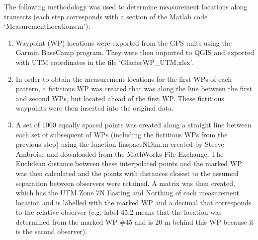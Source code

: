 \documentclass{sfuthesis}
\begin{document}
{\begin{appendices}
 The following methodology was used to determine measurement locations along transects (each step corresponds with a section of the Matlab code `MeasurementLocations.m'): 
\begin{enumerate}
	\item Waypoint (WP) locations were exported from the GPS units using the Garmin BaseCamp program. They were then imported to QGIS and exported with UTM coordinates in the file `GlacierWP\_UTM.xlsx'. 
	\item In order to obtain the measurement locations for the first WPs of each pattern, a fictitious WP was created that was along the line between the first and second WPs, but located ahead of the first WP. These fictitious waypoints were then inserted into the original data. 
	\item A set of 1000 equally spaced points was created along a straight line between each set of subsequent of WPs (including the fictitious WPs from the previous step) using the function linspaceNDim.m created by Steeve Ambroise and downloaded from the MathWorks File Exchange. The Euclidean distance between these interpolated points and the marked WP was then calculated and the points with distances closest to the assumed separation between observers were retained. A matrix was then created, which has the UTM Zone 7N Easting and Northing of each measurement location and is labelled with the marked WP and a decimal that corresponds to the relative observer (e.g. label 45.2 means that the location was determined from the marked WP \#45 and is 20 m behind this WP because it is the second observer). 
\end{enumerate}


\end{appendices}}
\end{document}
